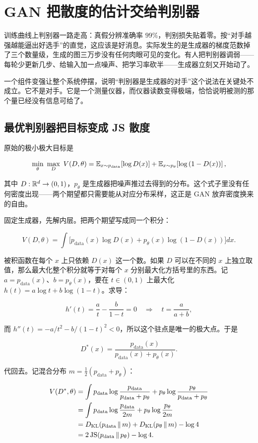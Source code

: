 \section{GAN 把散度的估计交给判别器}
\label{sec:14-Deep-Learning/07-Generative-Models-Unified/03}

训练曲线上判别器一路走高：真假分辨准确率 \(99\%\)，判别损失贴着零。按``对手越强越能逼出好选手''的直觉，这应该是好消息。实际发生的是生成器的梯度范数掉了三个数量级，生成的图三万步没有任何肉眼可见的变化。有人把判别器调弱——每轮少更新几步、给输入加一点噪声、把学习率砍半——生成器立刻又开始动了。

一个组件变强让整个系统停摆，说明``判别器是生成器的对手''这个说法在关键处不成立。它不是对手。它是一个测量仪器，而仪器读数变得极端，恰恰说明被测的那个量已经没有信息可给了。

\subsection{最优判别器把目标变成 JS 散度}

原始的极小极大目标是

\[
\min_\theta\ \max_D\ V(D,\theta)
=\mathbb{E}_{x\sim p_{\text{data}}}\!\left[\log D(x)\right]
+\mathbb{E}_{x\sim p_\theta}\!\left[\log\left(1-D(x)\right)\right],
\]

其中 \(D:\mathbb{R}^d\to(0,1)\)，\(p_\theta\) 是生成器把噪声推过去得到的分布。这个式子里没有任何密度出现——两个期望都只需要能从对应分布采样，这正是 GAN 放弃密度换来的自由。

固定生成器，先解内层。把两个期望写成同一个积分：

\[
V(D,\theta)=\int\Big[p_{\text{data}}(x)\log D(x)+p_\theta(x)\log\left(1-D(x)\right)\Big]dx.
\]

被积函数在每个 \(x\) 上只依赖 \(D(x)\) 这一个数。如果 \(D\) 可以在不同的 \(x\) 上独立取值，那么最大化整个积分就等于对每个 \(x\) 分别最大化方括号里的东西。记 \(a=p_{\text{data}}(x)\)、\(b=p_\theta(x)\)，要在 \(t\in(0,1)\) 上最大化 \(h(t)=a\log t+b\log(1-t)\)。求导：

\[
h'(t)=\frac{a}{t}-\frac{b}{1-t}=0
\quad\Longrightarrow\quad
t=\frac{a}{a+b},
\]

而 \(h''(t)=-a/t^2-b/(1-t)^2<0\)，所以这个驻点是唯一的极大点。于是

\[
D^\ast(x)=\frac{p_{\text{data}}(x)}{p_{\text{data}}(x)+p_\theta(x)}.
\]

代回去。记混合分布 \(m=\tfrac12(p_{\text{data}}+p_\theta)\)：

\[
\begin{aligned}
V(D^\ast,\theta)
&=\int p_{\text{data}}\log\frac{p_{\text{data}}}{p_{\text{data}}+p_\theta}
+p_\theta\log\frac{p_\theta}{p_{\text{data}}+p_\theta}\\
&=\int p_{\text{data}}\log\frac{p_{\text{data}}}{2m}
+p_\theta\log\frac{p_\theta}{2m}\\
&=D_{\mathrm{KL}}(p_{\text{data}}\,\Vert\,m)+D_{\mathrm{KL}}(p_\theta\,\Vert\,m)-\log 4\\
&=2\operatorname{JS}(p_{\text{data}}\,\Vert\,p_\theta)-\log 4 .
\end{aligned}
\]

